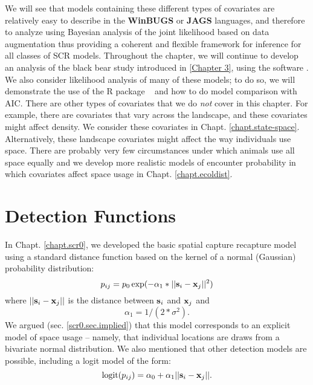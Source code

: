 We will see that models containing these different types of
covariates are relatively easy to describe in the {\bf WinBUGS} or
{\bf JAGS} languages, and
therefore to analyze using Bayesian analysis of the joint likelihood
based on data augmentation thus providing a coherent and flexible
framework for inference for all classes of SCR models.  Throughout the
chapter, we will continue to develop an analysis of the black bear
study introduced in \ref{Chapter 3}, using the software
\jags.  We also
consider likelihood analysis of many of these models; to do so, we
will demonstrate the use of the R package \secr~ and how to do model
comparison with AIC.
There are other types of covariates that we do {\it not} cover in this
chapter. For example, there are covariates that vary across the
landscape, and these covariates
might affect density. We consider these covariates in
Chapt. \ref{chapt.state-space}.
Alternatively, these landscape covariates might affect the way individuals use
space. There are probably very few circumstances under which animals use all space equally and we develop more realistic models of encounter
probability in which covariates affect space usage in Chapt. \ref{chapt.ecoldist}.


\section{Detection Functions}

In Chapt. \ref{chapt.scr0}, we developed the basic spatial capture recapture model using  a
standard distance function based on the kernel of a normal (Gaussian) probability
distribution:
\[
p_{ij} = p_{0} \exp(-\alpha_{1} *||{\bf s}_{i}-{\bf x}_{j}||^2)
\]
where $||{\bf s}_{i}-{\bf x}_{j}||$ is the distance between ${\bf
  s}_{i}$ and ${\bf x}_{j}$ and
\[
\alpha_{1} = 1/(2*\sigma^2).
\]
We argued (sec. \ref{scr0.sec.implied}) that this model
corresponds to an explicit model of space usage -- namely, that
individual locations are draws from a bivariate normal
distribution. We also mentioned that other detection models are
possible, including a logit model of the form:
\begin{equation}
	\mbox{logit}(p_{ij}) = \alpha_{0} + \alpha_1 ||{\bf s}_{i}-{\bf x}_{j} ||.
\label{covariates.eq.logit}
\end{equation}

